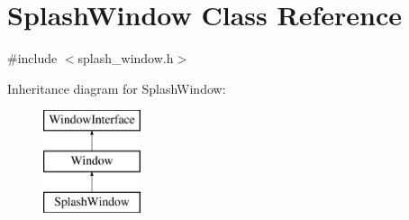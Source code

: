 \hypertarget{classSplashWindow}{\section{Splash\-Window Class Reference}
\label{classSplashWindow}
}


{\ttfamily \#include $<$splash\-\_\-window.\-h$>$}

Inheritance diagram for Splash\-Window\-:\begin{figure}[H]
\begin{center}
\leavevmode
\includegraphics[height=3.000000cm]{classSplashWindow}
\end{center}
\end{figure}
